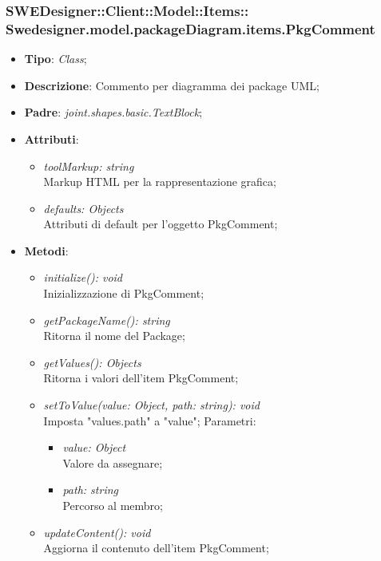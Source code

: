 \documentclass[../DefinizioneDiProdotto.tex]{subfiles}
\begin{document}
			\subsubsection[Swedesigner.model.packageDiagram.items.PkgComment]{SWEDesigner::Client::Model::Items::\\Swedesigner.model.packageDiagram.items.PkgComment}
			\hypertarget{SWEDesigner::Client::Model::Items::Swedesigner.model.packageDiagram.items.PkgComment}{}
			\begin{itemize}
				\item \textbf{Tipo}: \emph{Class};
				\item \textbf{Descrizione}: Commento per diagramma dei package UML;
				\item \textbf{Padre}: \emph{joint.shapes.basic.TextBlock};
				\item \textbf{Attributi}:
				\begin{itemize}
					\item \emph{toolMarkup: string}\\ 
					Markup HTML per la rappresentazione grafica;
					\item \emph{defaults: Objects}\\
					Attributi di default per l'oggetto PkgComment;
				\end{itemize}
				\item \textbf{Metodi}:
				\begin{itemize}
					\item \emph{initialize(): void}\\
					Inizializzazione di PkgComment;
					\item \emph{getPackageName(): string}\\
					Ritorna il nome del Package;
					\item \emph{getValues(): Objects}\\
					Ritorna i valori dell'item PkgComment;
					\item \emph{setToValue(value: Object, path: string): void}\\
					Imposta "values.path" a "value";
					Parametri:
					\begin{itemize}
						\item \emph{value: Object} \\
						Valore da assegnare;
						\item \emph{path: string} \\
						Percorso al membro;
					\end{itemize}
					\item \emph{updateContent(): void}\\
					Aggiorna il contenuto dell'item PkgComment;
				\end{itemize}
			\end{itemize}
			
\end{document}
